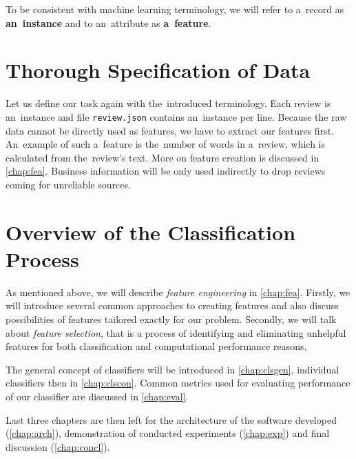To be consistent with machine learning terminology, we will refer to a~record as {\bf an~instance} and to an~attribute as {\bf a~feature}.

\citet{Song14} 

\section{Thorough Specification of Data}

Let us define our task again with the~introduced terminology.
Each review is an~instance and file \texttt{review.json} contains an~instance per line.
Because the raw data cannot be directly used as features, we have to extract our features first.
An~example of such a~feature is the~number of words in a~review, which is calculated from the~review's text.
More on feature creation is discussed in \autoref{chap:fea}.
Business information will be only used indirectly to drop reviews coming for unreliable sources.

\section{Overview of the Classification Process}

As mentioned above, we will describe {\it feature engineering} in \autoref{chap:fea}.
Firstly, we will introduce several common approaches to creating features and also discuss possibilities of features tailored exactly for our problem.
Secondly, we will talk about {\it feature selection}, that is a process of identifying and eliminating unhelpful features for both classification and computational performance reasons.

The general concept of classifiers will be introduced in \autoref{chap:clsgen}, individual classifiers then in \autoref{chap:clscon}.
Common metrics used for evaluating performance of our classifier are discussed in \autoref{chap:eval}.

Last three chapters are then left for the architecture of the software developed (\autoref{chap:arch}), demonstration of conducted experiments (\autoref{chap:exp}) and final discussion (\autoref{chap:concl}).
